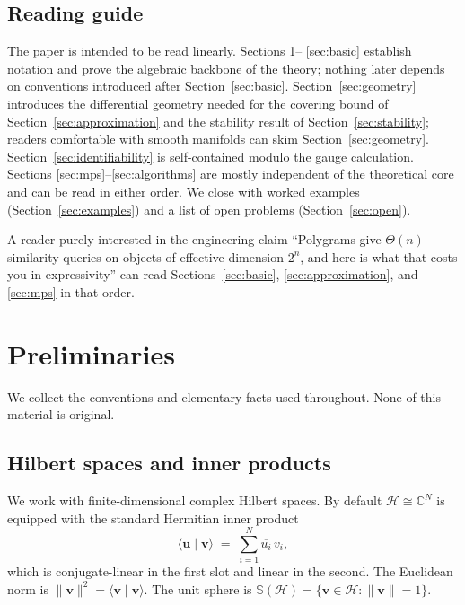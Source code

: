 \documentclass[11pt,letterpaper]{article}
\theoremstyle{definition}
\newcommand{\C}{\mathbb{C}}
\newcommand{\Sphere}{\mathbb{S}}
\newcommand{\Hilb}{\mathcal{H}}
\newcommand{\inner}[2]{\langle #1 \mid #2 \rangle}
\newcommand{\norm}[1]{\lVert #1 \rVert}
\begin{document}
\subsection{Reading guide}

The paper is intended to be read linearly. Sections \ref{sec:prelim}--
\ref{sec:basic} establish notation and prove the algebraic backbone of the
theory; nothing later depends on conventions introduced after
Section~\ref{sec:basic}. Section~\ref{sec:geometry} introduces the differential
geometry needed for the covering bound of Section~\ref{sec:approximation} and
the stability result of Section~\ref{sec:stability}; readers comfortable with
smooth manifolds can skim Section~\ref{sec:geometry}.
Section~\ref{sec:identifiability} is self-contained modulo the gauge
calculation. Sections \ref{sec:mps}--\ref{sec:algorithms} are mostly
independent of the theoretical core and can be read in either order. We close
with worked examples (Section~\ref{sec:examples}) and a list of open problems
(Section~\ref{sec:open}).

A reader purely interested in the engineering claim ``Polygrams give $\Theta(n)$
similarity queries on objects of effective dimension $2^{n}$, and here is what
that costs you in expressivity'' can read Sections~\ref{sec:basic},
\ref{sec:approximation}, and \ref{sec:mps} in that order.

\section{Preliminaries}
\label{sec:prelim}

We collect the conventions and elementary facts used throughout. None of this
material is original.

\subsection{Hilbert spaces and inner products}

We work with finite-dimensional complex Hilbert spaces. By default
$\Hilb \cong \C^{N}$ is equipped with the standard Hermitian inner product
\[
\inner{\bm{u}}{\bm{v}} \;=\; \sum_{i=1}^{N} \overline{u_{i}}\, v_{i},
\]
which is conjugate-linear in the first slot and linear in the second. The
Euclidean norm is $\norm{\bm{v}}^{2} = \inner{\bm{v}}{\bm{v}}$. The unit sphere
is $\Sphere(\Hilb) = \{\bm{v} \in \Hilb : \norm{\bm{v}} = 1\}$.
\end{document}
